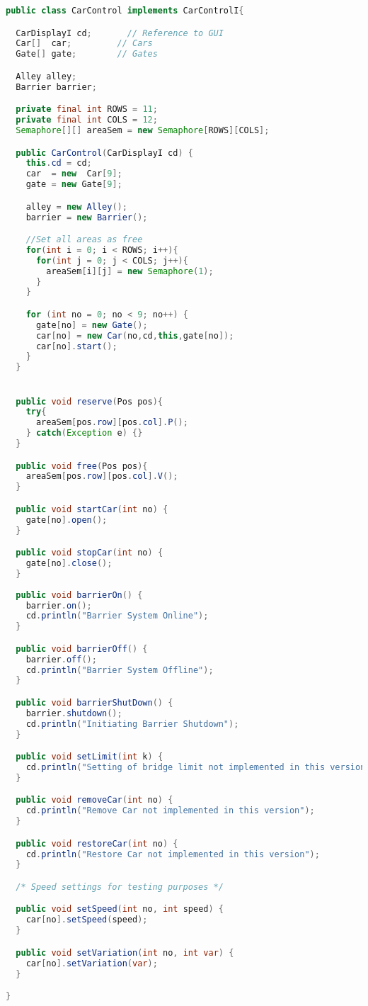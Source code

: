 \begin{lstlisting}[language=java]
public class CarControl implements CarControlI{

  CarDisplayI cd;       // Reference to GUI
  Car[]  car;         // Cars
  Gate[] gate;        // Gates

  Alley alley;
  Barrier barrier;

  private final int ROWS = 11;
  private final int COLS = 12;
  Semaphore[][] areaSem = new Semaphore[ROWS][COLS];

  public CarControl(CarDisplayI cd) {
    this.cd = cd;
    car  = new  Car[9];
    gate = new Gate[9];

    alley = new Alley();
    barrier = new Barrier();

    //Set all areas as free
    for(int i = 0; i < ROWS; i++){
      for(int j = 0; j < COLS; j++){
        areaSem[i][j] = new Semaphore(1);
      }
    }

    for (int no = 0; no < 9; no++) {
      gate[no] = new Gate();
      car[no] = new Car(no,cd,this,gate[no]);
      car[no].start();
    } 
  }


  public void reserve(Pos pos){
    try{
      areaSem[pos.row][pos.col].P();
    } catch(Exception e) {}
  }

  public void free(Pos pos){
    areaSem[pos.row][pos.col].V();
  }

  public void startCar(int no) {
    gate[no].open();
  }

  public void stopCar(int no) {
    gate[no].close();
  }
  
  public void barrierOn() {
    barrier.on();
    cd.println("Barrier System Online");
  }

  public void barrierOff() { 
    barrier.off();
    cd.println("Barrier System Offline");
  }

  public void barrierShutDown() { 
    barrier.shutdown();
    cd.println("Initiating Barrier Shutdown");
  }

  public void setLimit(int k) { 
    cd.println("Setting of bridge limit not implemented in this version");
  }

  public void removeCar(int no) { 
    cd.println("Remove Car not implemented in this version");
  }

  public void restoreCar(int no) { 
    cd.println("Restore Car not implemented in this version");
  }

  /* Speed settings for testing purposes */

  public void setSpeed(int no, int speed) { 
    car[no].setSpeed(speed);
  }

  public void setVariation(int no, int var) { 
    car[no].setVariation(var);
  }

}







\end{lstlisting}